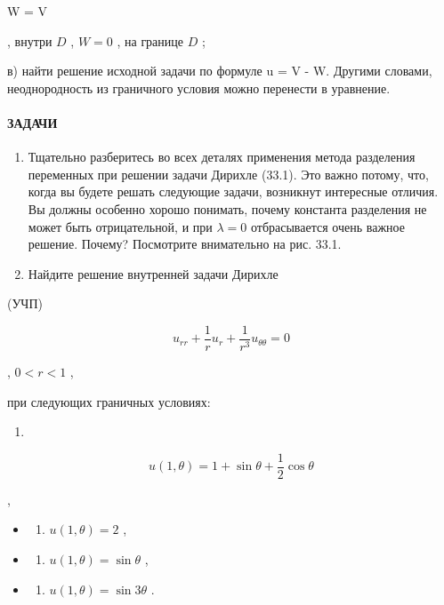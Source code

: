 \documentclass[
  ukrainian,
]{article}
\providecommand{\tightlist}{%
  \setlength{\itemsep}{0pt}\setlength{\parskip}{0pt}}
\begin{document}
 W =  V

, внутри \(D\) , \(W = 0\) , на границе \(D\) ;

в) найти решение исходной задачи по формуле u = V - W. Другими словами,
неоднородность из граничного условия можно перенести в уравнение.

\paragraph{ЗАДАЧИ}\label{ux437ux430ux434ux430ux447ux438-8}

\begin{enumerate}
\def\labelenumi{\arabic{enumi}.}
\item
  Тщательно разберитесь во всех деталях применения метода разделения
  переменных при решении задачи Дирихле (33.1). Это важно потому, что,
  когда вы будете решать следующие задачи, возникнут интересные отличия.
  Вы должны особенно хорошо понимать, почему константа разделения не
  может быть отрицательной, и при \(\lambda=0\) отбрасывается очень
  важное решение. Почему? Посмотрите внимательно на рис. 33.1.
\item
  Найдите решение внутренней задачи Дирихле
\end{enumerate}

(УЧП)

\[
u_{rr} + \frac{1}{r} u_r + \frac{1}{r^3} u_{\theta\theta} = 0
\]

, \(0 < r < 1\) ,

при следующих граничных условиях:

\begin{enumerate}
\def\labelenumi{\alph{enumi})}
\tightlist
\item
\end{enumerate}

\[
u(1, \theta) = 1 + \sin \theta + \frac{1}{2} \cos \theta
\]

,

\begin{itemize}
\tightlist
\item
  \begin{enumerate}
  \def\labelenumi{\arabic{enumi})}
  \setcounter{enumi}{5}
  \tightlist
  \item
    \(u(1, \theta) = 2\) ,
  \end{enumerate}
\item
  \begin{enumerate}
  \def\labelenumi{\Alph{enumi})}
  \setcounter{enumi}{1}
  \tightlist
  \item
    \(u(1, \theta) = \sin \theta\) ,
  \end{enumerate}
\item
  \begin{enumerate}
  \def\labelenumi{\alph{enumi})}
  \setcounter{enumi}{17}
  \tightlist
  \item
    \(u(1, \theta) = \sin 3\theta\) .
  \end{enumerate}
\end{itemize}
\end{document}
